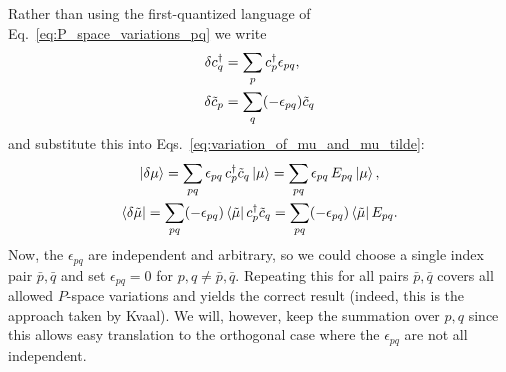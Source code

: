 \documentclass[aip,jcp,preprint,superscriptaddress,nofootinbib]{revtex4-1}
\begin{document}
Rather than using the first-quantized language of Eq.~\eqref{eq:P_space_variations_pq} we
write
\begin{subequations} \label{eq:P_space_variations_pq_SQ}
    \begin{align}
        \delta c^{\dagger}_{q} &= \sum_{p} c^{\dagger}_{p} \epsilon_{pq}, \\
        \delta\tilde{c}_{p} &= \sum_{q} (-\epsilon_{pq}) \tilde{c}_{q}
    \end{align}
\end{subequations}
and substitute this into Eqs.~\eqref{eq:variation_of_mu_and_mu_tilde}:
\begin{subequations} \label{eq:variation_of_mu_and_mu_tilde_pq}
    \begin{gather}
        \ket{\delta \mu} 
        = \sum_{pq} \epsilon_{pq} \, c^{\dagger}_{p} \tilde{c}_{q} \ket{\mu}          
        = \sum_{pq} \epsilon_{pq} \, E_{{p} {q}} \ket{\mu}  , \\
        \bra{\delta \tilde{\mu}} 
        = \sum_{pq} (-\epsilon_{pq}) \bra{\tilde{\mu}} c^{\dagger}_{p} \tilde{c}_{q}  
        = \sum_{pq} (-\epsilon_{pq}) \bra{\tilde{\mu}} E_{{p} {q}} .
    \end{gather}
\end{subequations}
Now, the $\epsilon_{pq}$ are independent and arbitrary, so 
we could choose a single index pair $\bar{p}, \bar{q}$ 
and set $\epsilon_{pq} = 0$ for $p,q \neq \bar{p}, \bar{q}$. Repeating
this for all pairs $\bar{p}, \bar{q}$ covers all allowed $P$-space variations and
yields the correct result (indeed, this is the approach taken by Kvaal\cite{kvaalInitioQuantumDynamics2012}).
We will, however, keep the summation over $p,q$ since this allows easy translation
to the orthogonal case where the $\epsilon_{pq}$ are not all independent.
\end{document}
